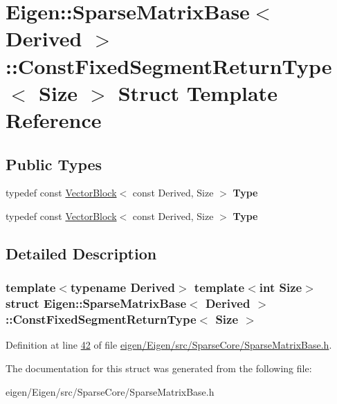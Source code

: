 \hypertarget{struct_eigen_1_1_sparse_matrix_base_1_1_const_fixed_segment_return_type}{}\section{Eigen\+:\+:Sparse\+Matrix\+Base$<$ Derived $>$\+:\+:Const\+Fixed\+Segment\+Return\+Type$<$ Size $>$ Struct Template Reference}
\label{struct_eigen_1_1_sparse_matrix_base_1_1_const_fixed_segment_return_type}
\subsection*{Public Types}
\begin{DoxyCompactItemize}
\item 
\mbox{\label{struct_eigen_1_1_sparse_matrix_base_1_1_const_fixed_segment_return_type_acae60bb4d8a51170372941a2b1b3e409}} 
typedef const \hyperlink{group___core___module_class_eigen_1_1_vector_block}{Vector\+Block}$<$ const Derived, Size $>$ {\bfseries Type}
\item 
\mbox{\label{struct_eigen_1_1_sparse_matrix_base_1_1_const_fixed_segment_return_type_acae60bb4d8a51170372941a2b1b3e409}} 
typedef const \hyperlink{group___core___module_class_eigen_1_1_vector_block}{Vector\+Block}$<$ const Derived, Size $>$ {\bfseries Type}
\end{DoxyCompactItemize}


\subsection{Detailed Description}
\subsubsection*{template$<$typename Derived$>$\newline
template$<$int Size$>$\newline
struct Eigen\+::\+Sparse\+Matrix\+Base$<$ Derived $>$\+::\+Const\+Fixed\+Segment\+Return\+Type$<$ Size $>$}



Definition at line \hyperlink{eigen_2_eigen_2src_2_sparse_core_2_sparse_matrix_base_8h_source_l00042}{42} of file \hyperlink{eigen_2_eigen_2src_2_sparse_core_2_sparse_matrix_base_8h_source}{eigen/\+Eigen/src/\+Sparse\+Core/\+Sparse\+Matrix\+Base.\+h}.



The documentation for this struct was generated from the following file\+:\begin{DoxyCompactItemize}
\item 
eigen/\+Eigen/src/\+Sparse\+Core/\+Sparse\+Matrix\+Base.\+h\end{DoxyCompactItemize}
